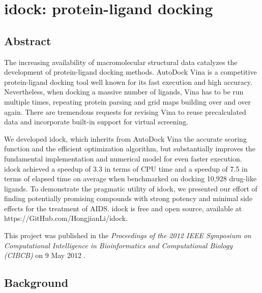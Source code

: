 \chapter{idock: protein-ligand docking}

\section{Abstract}

The increasing availability of macromolecular structural data catalyzes the development of protein-ligand docking methods. AutoDock Vina is a competitive protein-ligand docking tool well known for its fast execution and high accuracy. Nevertheless, when docking a massive number of ligands, Vina has to be run multiple times, repeating protein parsing and grid maps building over and over again. There are tremendous requests for revising Vina to reuse precalculated data and incorporate built-in support for virtual screening.

We developed idock, which inherits from AutoDock Vina the accurate scoring function and the efficient optimization algorithm, but substantially improves the fundamental implementation and numerical model for even faster execution. idock achieved a speedup of 3.3 in terms of CPU time and a speedup of 7.5 in terms of elapsed time on average when benchmarked on docking 10,928 drug-like ligands. To demonstrate the pragmatic utility of idock, we presented our effort of finding potentially promising compounds with strong potency and minimal side effects for the treatment of AIDS. idock is free and open source, available at https://GitHub.com/HongjianLi/idock.

This project was published in the \textit{Proceedings of the 2012 IEEE Symposium on Computational Intelligence in Bioinformatics and Computational Biology (CIBCB)} on 9 May 2012 \citep{1153}.

\section{Background}

